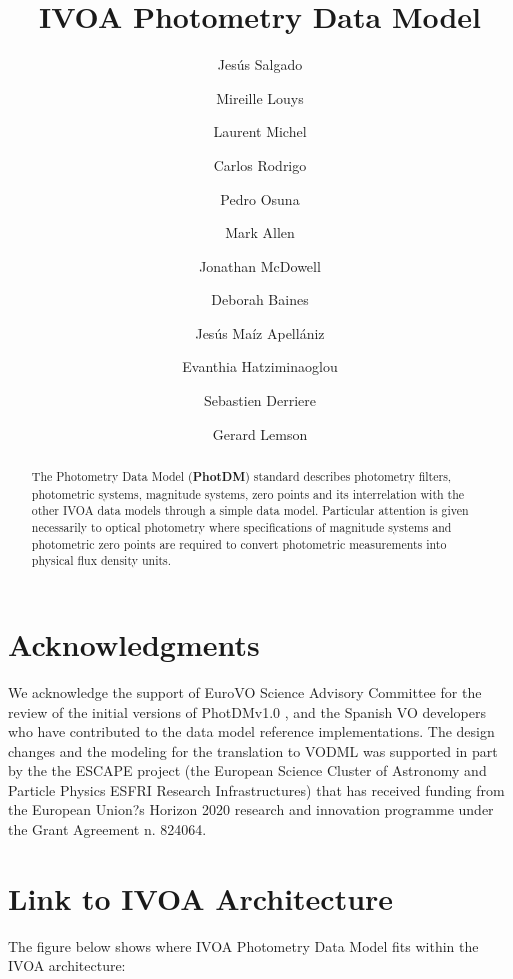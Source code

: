 \documentclass[11pt,a4paper]{ivoa}
\title{IVOA Photometry Data Model}
\author{Jesús Salgado}
\author{Mireille Louys}
\author{Laurent Michel}
\author{Carlos Rodrigo}
\author{Pedro Osuna}
\author{Mark Allen}
\author{Jonathan McDowell}
\author{Deborah Baines}
\author{Jesús Maíz Apellániz}
\author{Evanthia Hatziminaoglou}
\author{Sebastien \mbox{Derriere}}
\author{Gerard Lemson}
\begin{document}
\begin{abstract}
The Photometry Data Model (\textbf{PhotDM}) standard describes photometry
filters, photometric systems, magnitude systems, zero points and its
interrelation with the other IVOA data models through a simple data model.
Particular attention is given necessarily to optical photometry where
specifications of magnitude systems and photometric zero points are required
to convert photometric measurements into physical flux density units.
\end{abstract}

\section*{Acknowledgments}
We acknowledge the support of EuroVO Science Advisory Committee for the review of the
initial versions of PhotDMv1.0 , and the Spanish VO developers who have contributed
to the data model reference implementations.
The design changes and the modeling for the translation to VODML was supported in part by the
the ESCAPE project (the European Science Cluster of Astronomy and Particle Physics ESFRI Research Infrastructures)
that has received funding from the European Union?s Horizon 2020 research and innovation programme under the Grant Agreement n. 824064.


\pagebreak

\section*{Link to IVOA Architecture}
The figure below shows where IVOA Photometry Data Model fits within the
IVOA architecture:


\end{document}
